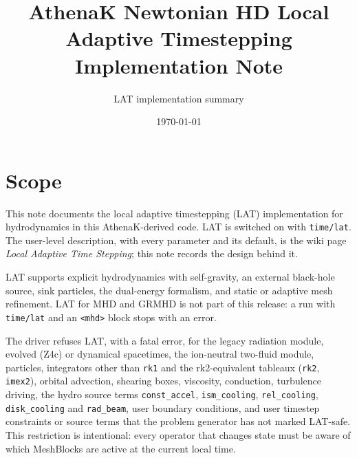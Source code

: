 \documentclass[11pt]{article}
\title{AthenaK Newtonian HD Local Adaptive Timestepping Implementation Note}
\author{LAT implementation summary}
\date{\today}
\begin{document}
\maketitle

\section{Scope}

This note documents the local adaptive timestepping (LAT) implementation for
hydrodynamics in this AthenaK-derived code.  LAT is switched on with
\texttt{time/lat}.  The user-level description, with every parameter and its
default, is the wiki page \emph{Local Adaptive Time Stepping}; this note records
the design behind it.

LAT supports explicit hydrodynamics with self-gravity, an external black-hole
source, sink particles, the dual-energy formalism, and static or adaptive mesh
refinement.  LAT for MHD and GRMHD is not part of this release: a run with
\texttt{time/lat} and an \texttt{<mhd>} block stops with an error.

The driver refuses LAT, with a fatal error, for the legacy radiation module,
evolved (Z4c) or dynamical spacetimes, the ion-neutral two-fluid module,
particles, integrators other than \texttt{rk1} and the rk2-equivalent tableaux
(\texttt{rk2}, \texttt{imex2}), orbital advection, shearing boxes, viscosity,
conduction, turbulence driving, the hydro source terms \texttt{const\_accel},
\texttt{ism\_cooling}, \texttt{rel\_cooling}, \texttt{disk\_cooling} and
\texttt{rad\_beam}, user boundary conditions, and user
timestep constraints or source terms that the problem generator has not marked
LAT-safe.  This restriction is intentional: every operator that changes state
must be aware of which MeshBlocks are active at the current local time.
\end{document}
